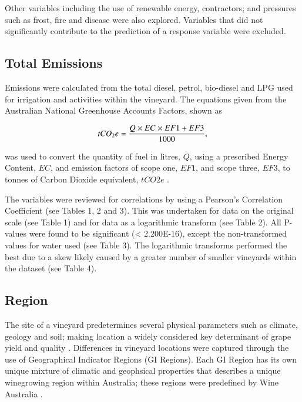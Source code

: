 \documentclass[review,12pt,authoryear]{elsarticle}
\begin{document}
\begin{linenumbers}
Other variables including the use of renewable energy, contractors; and pressures such as frost, fire and disease were also explored. Variables that did not significantly contribute to the prediction of a response variable were excluded.

\subsection{Total Emissions}
Emissions were calculated from the total diesel, petrol, bio-diesel and LPG used for irrigation and activities within the vineyard. The equations given from the Australian National Greenhouse Accounts Factors, shown as 

\begin{equation}
\label{(1)}
    tCO_{2}e={{Q \times EC \times EF1 + EF3}\over{1000}},
\end{equation}

was used to convert the quantity of fuel in litres, $Q$, using a prescribed Energy Content, $EC$, and emission factors of scope one, $EF1$, and scope three, $EF3$, to tonnes of Carbon Dioxide equivalent, $tCO2e$ \citep{departmentofclimatechangeenergytheenvironmentandwaterAustralianNationalGreenhouse2022}.

The variables were reviewed for correlations by using a Pearson's Correlation Coefficient (see Tables 1, 2 and 3). This was undertaken for data on the original scale (see Table 1) and for data as a logarithmic transform (see Table 2). All P-values were found to be significant (< 2.200E-16), except the non-transformed values for water used (see Table 3). The logarithmic transforms performed the best due to a skew likely caused by a greater number of smaller vineyards within the dataset (see Table 4).

\subsection{Region}
The site of a vineyard predetermines several physical parameters such as climate, geology and soil; making location a widely considered key determinant of grape yield and quality \citep{abbalDecisionSupportSystem2016,agostaRegionalClimateVariability2012,fragaMultivariateClusteringViticultural2017}. Differences in vineyard locations were captured through the use of Geographical Indicator Regions (GI Regions). Each GI Region has its own unique mixture of climatic and geophsical properties that describes a unique winegrowing region within Australia; these regions were predefined by Wine Australia \citep{hallidayAustralianWineEncyclopedia2009,oliverReviewSoilPhysical2013,soarClimateDriversRed2008}.


\end{linenumbers}
\end{document}
